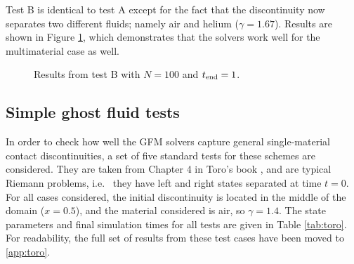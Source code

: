 \documentclass[final,3p,twocolumn]{elsarticle}
\begin{document}
Test B is identical to test A except for the fact that the discontinuity now
separates two different fluids; namely air and helium ($\gamma=1.67$).  Results
are shown in Figure \ref{fig:testB}, which demonstrates that the solvers work
well for the multimaterial case as well. 


\begin{figure}[htb]
    \centering
    \caption[caption]
    {
        Results from test B with $N=100$ and $t_{\rm end}=1$. 
    }
    \label{fig:testB}
\end{figure}

\subsection{Simple ghost fluid tests}
\label{subsec:toro}

In order to check how well the GFM solvers capture general single-material
contact discontinuities, a set of five standard tests for these schemes are
considered. They are taken from Chapter 4 in Toro's book
\cite{toro2013riemann}, and are typical Riemann problems, i.e.~ they have left
and right states separated at time $t=0$. For all cases considered, the initial
discontinuity is located in the middle of the domain ($x=0.5$), and the
material considered is air, so $\gamma=1.4$.  The state parameters and final
simulation times for all tests are given in Table \ref{tab:toro}. For
readability, the full set of results from these test cases have been moved to
\ref{app:toro}. 
\end{document}
